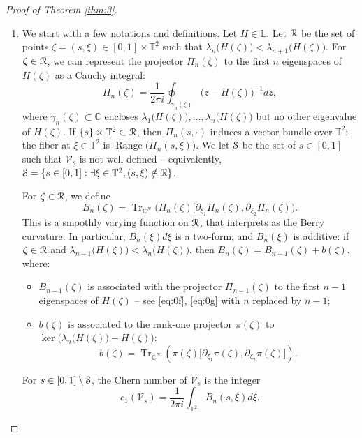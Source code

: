 \documentclass[11pt]{article}
\newcommand{\skpt}{\smallskip}
\numberwithin{equation}{section}
\let\pazocal\EuScript
\let\sep:
\theoremstyle{definition}
\DeclareMathOperator{\Range}{Range}
\DeclareMathOperator{\Tr}{Tr}
\newcommand{\RRR}{\pazocal{R}}
\newcommand{\SSS}{{\pazocal{S}}}
\newcommand{\VVV}{{\mathscr{V}}}
\newcommand{\C}{\mathbb{C}}
\newcommand{\Ll}{\mathbb{L}}
\newcommand{\Tt}{{\mathbb{T}}}
\let\p\partial
\begin{document}
\skpt
\begin{proof}[Proof of Theorem \ref{thm:3}]
\begin{enumerate}
\item
We start with a few notations and definitions. Let $H \in \Ll$. Let $\RRR$ be the set of points $\zeta = (s,\xi) \in [0,1] \times \Tt^2$ such that $\lambda_n\bigl( H(\zeta) \bigr) < \lambda_{n+1}\bigl(H(\zeta)\bigr)$. For $\zeta \in \RRR$, we can represent the projector $\Pi_n(\zeta)$ to the first $n$ eigenspaces of $H(\zeta)$ as a Cauchy integral:
\begin{equation}\label{eq:0f}
\Pi_n(\zeta) =
\dfrac{1}{2\pi i}\oint_{\gamma_n(\zeta)} \bigl( z - H(\zeta) \bigr)^{-1} dz,
\end{equation}
where $\gamma_n(\zeta) \subset \C$ encloses $\lambda_1\bigl( H(\zeta) \bigr), \dots, \lambda_n\bigl( H(\zeta) \bigr)$ but no other eigenvalue of $H(\zeta)$. If $\{s \} \times \Tt^2 \subset \RRR$, then $\Pi_n(s,\cdot)$ induces a vector bundle over $\Tt^2$: the fiber at $\xi \in \Tt^2$ is $\Range\bigl( \Pi_n(s,\xi)\bigr)$. We let $\SSS$ be the set of $s \in [0,1]$ such that $\VVV_s$ is not well-defined -- equivalently, $\SSS = \{s \in [0,1]\sep\exists \xi \in \Tt^2, (s,\xi) \notin \RRR\}$.

For $\zeta \in \RRR$, we define
\begin{equation}\label{eq:0g}
B_n(\zeta) = \Tr_{\C^N} \bigl( \Pi_n(\zeta) \bigl[ \p_{\xi_1} \Pi_n(\zeta), \p_{\xi_2} \Pi_n(\zeta) \bigr).
\end{equation}
This is a smoothly varying function on $\RRR$, that interprets as the Berry curvature. In particular, $B_n(\xi)d\xi$ is a two-form; and $B_n(\xi)$ is additive: if $\zeta \in \RRR$ and $\lambda_{n-1}\bigl( H(\zeta) \bigr) < \lambda_n\bigl(H(\zeta)\bigr)$, then $B_n(\zeta) = B_{n-1}(\zeta) + b(\zeta)$, where:
\begin{itemize}
\item $B_{n-1}(\zeta)$ is associated with the projector $\Pi_{n-1}(\zeta)$ to the first $n-1$ eigenspaces of $H(\zeta)$ -- see \eqref{eq:0f}, \eqref{eq:0g} with $n$ replaced by $n-1$;
\item $b(\zeta)$ is associated to the rank-one projector $\pi(\zeta)$ to $\ker\bigl( \lambda_n \bigl(H(\zeta)\bigr) - H(\zeta) \bigr)$:
\begin{equation}\label{eq:0y}
b(\zeta) = \Tr_{\C^N} \left( \pi(\zeta) \bigl[ \p_{\xi_1} \pi(\zeta), \p_{\xi_2} \pi(\zeta) \bigr]\right).
\end{equation}
\end{itemize}
For $s \in [0,1] \setminus \SSS$, the Chern number of $\VVV_s$ is the integer
\begin{equation*}
c_1(\VVV_s) = \dfrac{1}{2\pi i} \int_{\Tt^2} B_n(s,\xi) d\xi.
\end{equation*}


\end{enumerate}
\end{proof}
\end{document}
